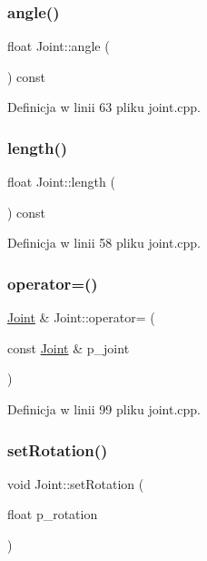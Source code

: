 \subsubsection{\texorpdfstring{angle()}{angle()}}
{\footnotesize\ttfamily float Joint\+::angle (\begin{DoxyParamCaption}{ }\end{DoxyParamCaption}) const}



Definicja w linii 63 pliku joint.\+cpp.

\mbox{\label{class_joint_acf30d550f5ca1e0e5eb60dafdc83d202}} 
\subsubsection{\texorpdfstring{length()}{length()}}
{\footnotesize\ttfamily float Joint\+::length (\begin{DoxyParamCaption}{ }\end{DoxyParamCaption}) const}



Definicja w linii 58 pliku joint.\+cpp.

\mbox{\label{class_joint_a3cd9a9a2dc9226b2588c6ddab9659bed}} 
\subsubsection{\texorpdfstring{operator=()}{operator=()}}
{\footnotesize\ttfamily \hyperlink{class_joint}{Joint} \& Joint\+::operator= (\begin{DoxyParamCaption}\item[{const \hyperlink{class_joint}{Joint} \&}]{p\+\_\+joint }\end{DoxyParamCaption})}



Definicja w linii 99 pliku joint.\+cpp.

\mbox{\label{class_joint_aab387e3e09c94b9e87d3b4c0e8f974aa}} 
\subsubsection{\texorpdfstring{set\+Rotation()}{setRotation()}}
{\footnotesize\ttfamily void Joint\+::set\+Rotation (\begin{DoxyParamCaption}\item[{float}]{p\+\_\+rotation }\end{DoxyParamCaption})}



